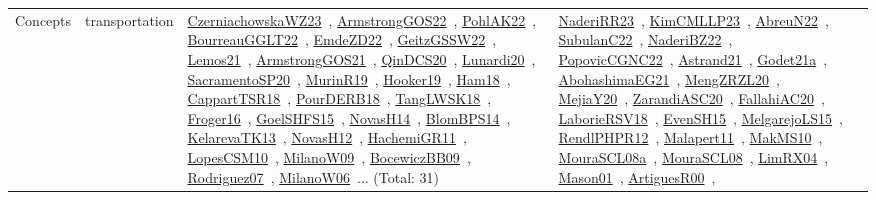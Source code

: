 {\begin{longtable}{lp{3cm}>{\raggedright\arraybackslash}p{6cm}>{\raggedright\arraybackslash}p{6cm}>{\raggedright\arraybackslash}p{8cm}}
Concepts & transportation & \href{works/CzerniachowskaWZ23.pdf}{CzerniachowskaWZ23}~\cite{CzerniachowskaWZ23}, \href{works/ArmstrongGOS22.pdf}{ArmstrongGOS22}~\cite{ArmstrongGOS22}, \href{works/PohlAK22.pdf}{PohlAK22}~\cite{PohlAK22}, \href{works/BourreauGGLT22.pdf}{BourreauGGLT22}~\cite{BourreauGGLT22}, \href{works/EmdeZD22.pdf}{EmdeZD22}~\cite{EmdeZD22}, \href{works/GeitzGSSW22.pdf}{GeitzGSSW22}~\cite{GeitzGSSW22}, \href{works/Lemos21.pdf}{Lemos21}~\cite{Lemos21}, \href{works/ArmstrongGOS21.pdf}{ArmstrongGOS21}~\cite{ArmstrongGOS21}, \href{works/QinDCS20.pdf}{QinDCS20}~\cite{QinDCS20}, \href{works/Lunardi20.pdf}{Lunardi20}~\cite{Lunardi20}, \href{works/SacramentoSP20.pdf}{SacramentoSP20}~\cite{SacramentoSP20}, \href{works/MurinR19.pdf}{MurinR19}~\cite{MurinR19}, \href{works/Hooker19.pdf}{Hooker19}~\cite{Hooker19}, \href{works/Ham18.pdf}{Ham18}~\cite{Ham18}, \href{works/CappartTSR18.pdf}{CappartTSR18}~\cite{CappartTSR18}, \href{works/PourDERB18.pdf}{PourDERB18}~\cite{PourDERB18}, \href{works/TangLWSK18.pdf}{TangLWSK18}~\cite{TangLWSK18}, \href{works/Froger16.pdf}{Froger16}~\cite{Froger16}, \href{works/GoelSHFS15.pdf}{GoelSHFS15}~\cite{GoelSHFS15}, \href{works/NovasH14.pdf}{NovasH14}~\cite{NovasH14}, \href{works/BlomBPS14.pdf}{BlomBPS14}~\cite{BlomBPS14}, \href{works/KelarevaTK13.pdf}{KelarevaTK13}~\cite{KelarevaTK13}, \href{works/NovasH12.pdf}{NovasH12}~\cite{NovasH12}, \href{works/HachemiGR11.pdf}{HachemiGR11}~\cite{HachemiGR11}, \href{works/LopesCSM10.pdf}{LopesCSM10}~\cite{LopesCSM10}, \href{works/MilanoW09.pdf}{MilanoW09}~\cite{MilanoW09}, \href{works/BocewiczBB09.pdf}{BocewiczBB09}~\cite{BocewiczBB09}, \href{works/Rodriguez07.pdf}{Rodriguez07}~\cite{Rodriguez07}, \href{works/MilanoW06.pdf}{MilanoW06}~\cite{MilanoW06}... (Total: 31) & \href{works/NaderiRR23.pdf}{NaderiRR23}~\cite{NaderiRR23}, \href{works/KimCMLLP23.pdf}{KimCMLLP23}~\cite{KimCMLLP23}, \href{works/AbreuN22.pdf}{AbreuN22}~\cite{AbreuN22}, \href{works/SubulanC22.pdf}{SubulanC22}~\cite{SubulanC22}, \href{works/NaderiBZ22.pdf}{NaderiBZ22}~\cite{NaderiBZ22}, \href{works/PopovicCGNC22.pdf}{PopovicCGNC22}~\cite{PopovicCGNC22}, \href{works/Astrand21.pdf}{Astrand21}~\cite{Astrand21}, \href{works/Godet21a.pdf}{Godet21a}~\cite{Godet21a}, \href{works/AbohashimaEG21.pdf}{AbohashimaEG21}~\cite{AbohashimaEG21}, \href{works/MengZRZL20.pdf}{MengZRZL20}~\cite{MengZRZL20}, \href{works/MejiaY20.pdf}{MejiaY20}~\cite{MejiaY20}, \href{works/ZarandiASC20.pdf}{ZarandiASC20}~\cite{ZarandiASC20}, \href{works/FallahiAC20.pdf}{FallahiAC20}~\cite{FallahiAC20}, \href{works/LaborieRSV18.pdf}{LaborieRSV18}~\cite{LaborieRSV18}, \href{works/EvenSH15.pdf}{EvenSH15}~\cite{EvenSH15}, \href{works/MelgarejoLS15.pdf}{MelgarejoLS15}~\cite{MelgarejoLS15}, \href{works/RendlPHPR12.pdf}{RendlPHPR12}~\cite{RendlPHPR12}, \href{works/Malapert11.pdf}{Malapert11}~\cite{Malapert11}, \href{works/MakMS10.pdf}{MakMS10}~\cite{MakMS10}, \href{works/MouraSCL08a.pdf}{MouraSCL08a}~\cite{MouraSCL08a}, \href{works/MouraSCL08.pdf}{MouraSCL08}~\cite{MouraSCL08}, \href{works/LimRX04.pdf}{LimRX04}~\cite{LimRX04}, \href{works/Mason01.pdf}{Mason01}~\cite{Mason01}, \href{works/ArtiguesR00.pdf}{ArtiguesR00}~\cite{ArtiguesR00}, 
\end{longtable}}
